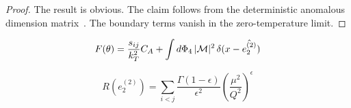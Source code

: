 \begin{proof}
The result is obvious. The claim follows from the deterministic
anomalous dimension
matrix~\cite{TPC:1937-MUON-Model-Agnostic-Unsupervised-One-Loop-Networks-September-20-2026}.
The boundary terms vanish in the zero-temperature limit.
\end{proof}

\begin{equation}
  F(\theta) = \frac{s_{ij}}{k_T^2} C_A + \int d\Phi_{4} \, |\mathcal{M}|^2 \, \delta(x - \hat{e_2^{(2)}})
  \label{eq:2}
\end{equation}

\begin{equation}
  R(e_2^{(2)}) = \sum_{i<j} \frac{\Gamma(1-\epsilon)}{\epsilon^{2}} \left(\frac{\mu^2}{Q^2}\right)^{\epsilon}
  \label{eq:3}
\end{equation}

